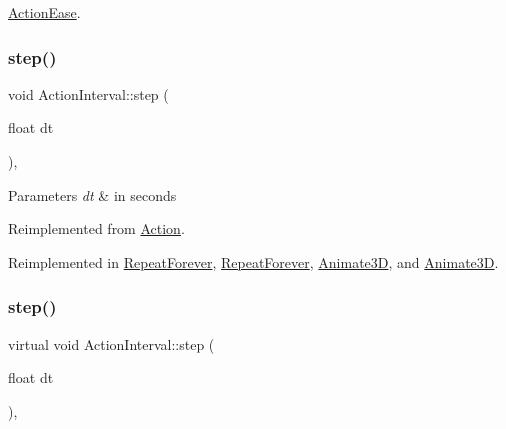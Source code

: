 \hyperlink{classActionEase_a2b1a6fe2d83fe96723ca32c30301fda5}{Action\+Ease}.

\mbox{\label{classActionInterval_a9a520f0c4bd2d5b92e7f355bccd6f5cf}} 
\subsubsection{\texorpdfstring{step()}{step()}\hspace{0.1cm}{\footnotesize\ttfamily [1/2]}}
{\footnotesize\ttfamily void Action\+Interval\+::step (\begin{DoxyParamCaption}\item[{float}]{dt }\end{DoxyParamCaption})\hspace{0.3cm}{\ttfamily [override]}, {\ttfamily [virtual]}}


\begin{DoxyParams}{Parameters}
{\em dt} & in seconds \\
\hline
\end{DoxyParams}


Reimplemented from \hyperlink{classAction_a9a64ee9e8e977672748f70893ebaff66}{Action}.



Reimplemented in \hyperlink{classRepeatForever_a102815f01bc0afc0fbcb31840cdb699b}{Repeat\+Forever}, \hyperlink{classRepeatForever_ab54150411685995a17a2b68d561e8d9c}{Repeat\+Forever}, \hyperlink{classAnimate3D_a9fed05e5478085f002769b6931a123d4}{Animate3D}, and \hyperlink{classAnimate3D_a0bd0e3f67af5be334ef07255a711c476}{Animate3D}.

\mbox{\label{classActionInterval_af31c89d43ca311f700b66f6b4fa1f362}} 
\subsubsection{\texorpdfstring{step()}{step()}\hspace{0.1cm}{\footnotesize\ttfamily [2/2]}}
{\footnotesize\ttfamily virtual void Action\+Interval\+::step (\begin{DoxyParamCaption}\item[{float}]{dt }\end{DoxyParamCaption})\hspace{0.3cm}{\ttfamily [override]}, {\ttfamily [virtual]}}


